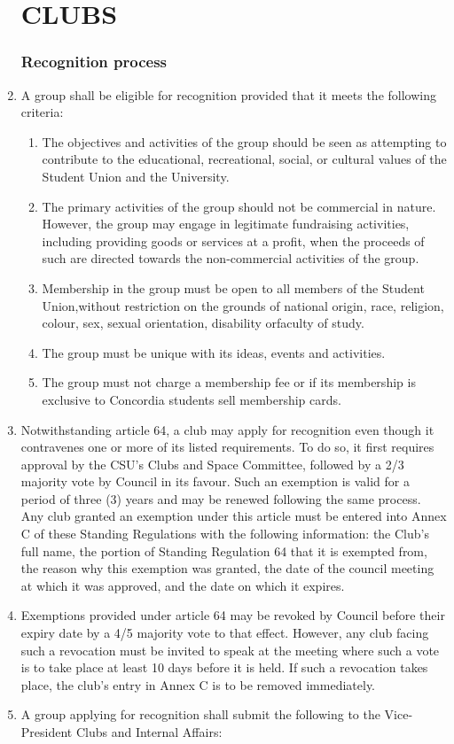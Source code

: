 \documentclass[oneside]{book}
\begin{document}
\begin{enumerate}
\part{\label{CLUBS}CLUBS }


\section{\label{Recognition_process}Recognition process }
\item A group shall be eligible for recognition provided that it meets the
following criteria: 

\begin{enumerate}
\item The objectives and activities of the group should be seen as attempting
to contribute to the educational, recreational, social, or cultural
values of the Student Union and the University. 
\item The primary activities of the group should not be commercial in nature.
However, the group may engage in legitimate fundraising activities,
including providing goods or services at a profit, when the proceeds
of such are directed towards the non-commercial activities of the
group. 
\item Membership in the group must be open to all members of the Student
Union,without restriction on the grounds of national origin, race,
religion, colour, sex, sexual orientation, disability orfaculty of
study. 
\item The group must be unique with its ideas, events and activities. 
\item The group must not charge a membership fee or if its membership is
exclusive to Concordia students sell membership cards. 
\end{enumerate}
\item Notwithstanding article 64, a club may apply for recognition even though it contravenes 
one or more of its listed requirements. To do so, it first requires approval by the CSU's 
Clubs and Space Committee, followed by a 2/3 majority vote by Council in its favour. 
Such an exemption is valid for a period of three (3) years and may be renewed following 
the same process. Any club granted an exemption under this article must be entered 
into Annex C of these Standing Regulations with the following information: the Club's 
full name, the portion of Standing Regulation 64 that it is exempted from, the reason 
why this exemption was granted, the date of the council meeting at which it was 
approved, and the date on which it expires.
\item Exemptions provided under article 64 may be revoked by Council before their expiry 
date by a 4/5 majority vote to that effect. However, any club facing such a revocation 
must be invited to speak at the meeting where such a vote is to take place at least 10 
days before it is held. If such a revocation takes place, the club's entry in Annex C is to be 
removed immediately.
\item A group applying for recognition shall submit the following to the
Vice-President Clubs and Internal Affairs:


\end{enumerate}
\end{document}
